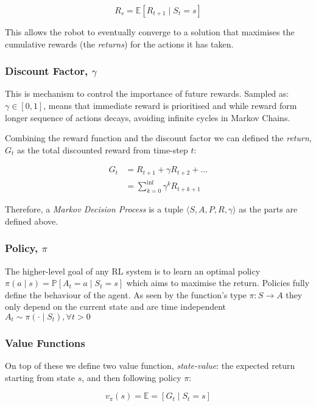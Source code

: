     \[R_s = \mathbb{E} \left[R_{t+1} \mid S_t = s\right]\]
    
    This allows the robot to eventually converge to a solution that maximises the cumulative rewards (the \emph{returns}) for the actions it has taken. 
  
  \subsubsection{Discount Factor, $\gamma$}
    This is mechanism to control the importance of future rewards. Sampled as: \(\gamma \in \left[0, 1\right]\), means that immediate reward is prioritised and while reward form longer sequence of actions decays, avoiding infinite cycles in Markov Chains.

    Combining the reward function and the discount factor we can defined the \emph{return}, $G_t$ as the total discounted reward from time-step $t$:

    \[ 
    \begin{aligned}
      G_t &= R_{t+1} + \gamma R_{t+2} + \ldots \\ 
      &= \sum_{k=0}^{\inf}\gamma^k R_{t+k+1} 
    \end{aligned}
    \]
    
    Therefore, a \emph{Markov Decision Process} is a tuple \(\langle S, A, P, R, \gamma \rangle\) as the parts are defined above.
    
    
  \subsubsection{Policy, $\pi$}
    The higher-level goal of any RL system is to learn an optimal policy \(\pi \left( a \mid s\right) = \mathbb{P} \left[A_t = a \mid S_t = s\right]\) which aims to maximise the return. Policies fully define the behaviour of the agent. As seen by the function's type \(\pi: S \rightarrow A \) they only depend on the current state and are time independent \( A_t \sim \pi\left( \cdot \mid S_t\right), \forall t > 0 \)
    
  \subsubsection{Value Functions}
    On top of these we define two value function, \emph{state-value}: the expected return starting from state $s$, and then following policy $\pi$:

    \[ v_\pi \left(s\right) = \mathbb{E} = \left[G_t \mid S_t = s\right]\]


